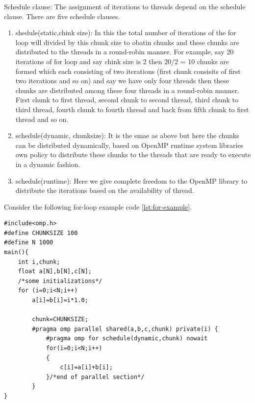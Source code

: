 \documentclass[12pt]{article}
\begin{document}
Schedule clause: The assignment of iterations to threads depend on the schedule clause.
There are five schedule clauses. 
\begin{enumerate}
    \item shedule(static,chink size): In this the total number of iterations of the for loop will divided by this chunk size to obatin chunks and these chunks are distributed to the threads in a round-robin manner.
    For example, say 20 iterations of for loop and say chink size is 2 then 20/2 = 10 chunks are formed which each consisting of two iterations (first chunk consisits of first two iterations and so on) and say we have only four threads then these chunks are distributed among these four threads in a round-robin manner.
    First chunk to first thread, second chunk to second thread, third chunk to third thread, fourth chunk to fourth thread and back from fifth chunk to first thread and so on.
    \item schedule(dynamic, chunksize): It is the smae as above but here the chunks can be distributed dynamically, based on  OpenMP runtime system libraries own policy to distribute these chunks to the 
    threads that are ready to execute in a dynamic fashion.
    \item schedule(runtime): Here we give complete freedom to the OpenMP library to distribute the iterations based on the availability of thread.
\end{enumerate}

Consider the following for-loop example code \ref{lst:for-example}.
\begin{lstlisting}[caption={for-Example: Addition of two Arrays},captionpos=b,label={lst:for-example}]
#include<omp.h>
#define CHUNKSIZE 100
#define N 1000
main(){
    int i,chunk;
    float a[N],b[N],c[N];
    /*some initializations*/
    for (i=0;i<N;i++)
        a[i]=b[i]=i*1.0;
    
        chunk=CHUNKSIZE;
        #pragma omp parallel shared(a,b,c,chunk) private(i) {
            #pragma omp for schedule(dynamic,chunk) nowait
            for(i=0;i<N;i++)
            {
                c[i]=a[i]+b[i];
            }/*end of parallel section*/
        }
}
\end{lstlisting}
\end{document}
